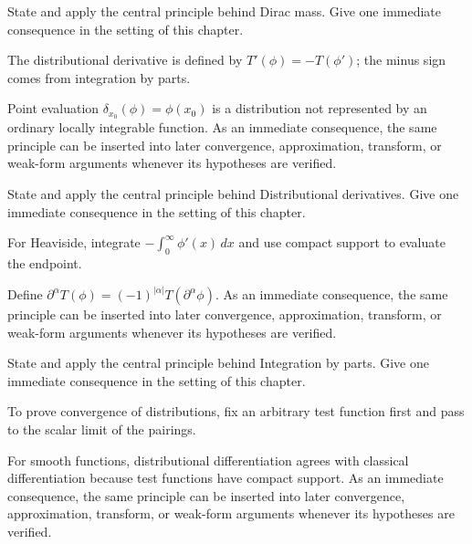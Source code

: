 \begin{exercise}\label{exr:iii16-03}
State and apply the central principle behind Dirac mass. Give one immediate consequence in the setting of this chapter.
\end{exercise}
\begin{hint}
The distributional derivative is defined by \(T'(\phi)=-T(\phi')\); the minus sign comes from integration by parts.
\end{hint}
\begin{solution}
Point evaluation $\delta_{x_0}(\phi)=\phi(x_0)$ is a distribution not represented by an ordinary locally integrable function. As an immediate consequence, the same principle can be inserted into later convergence, approximation, transform, or weak-form arguments whenever its hypotheses are verified.
\end{solution}

\begin{exercise}\label{exr:iii16-04}
State and apply the central principle behind Distributional derivatives. Give one immediate consequence in the setting of this chapter.
\end{exercise}
\begin{hint}
For Heaviside, integrate \(-\int_0^\infty \phi'(x)\,dx\) and use compact support to evaluate the endpoint.
\end{hint}
\begin{solution}
Define $\partial^\alpha T(\phi)=(-1)^{|\alpha|}T(\partial^\alpha\phi)$. As an immediate consequence, the same principle can be inserted into later convergence, approximation, transform, or weak-form arguments whenever its hypotheses are verified.
\end{solution}

\begin{exercise}\label{exr:iii16-05}
State and apply the central principle behind Integration by parts. Give one immediate consequence in the setting of this chapter.
\end{exercise}
\begin{hint}
To prove convergence of distributions, fix an arbitrary test function first and pass to the scalar limit of the pairings.
\end{hint}
\begin{solution}
For smooth functions, distributional differentiation agrees with classical differentiation because test functions have compact support. As an immediate consequence, the same principle can be inserted into later convergence, approximation, transform, or weak-form arguments whenever its hypotheses are verified.
\end{solution}

